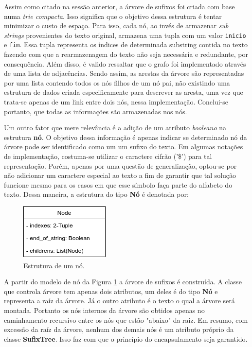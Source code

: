 Assim como citado na sessão anterior, a árvore de sufixos foi criada com base
numa \textit{trie compacta}.
Isso significa que o objetivo dessa estrutura é tentar minimizar o custo de
espaço.
Para isso, cada nó, ao invés de armazenar \textit{sub strings} provenientes
do texto original, armazena uma tupla com um valor \texttt{inicio} e
\texttt{fim}.
Essa tupla representa os índices de determinada substring contida no texto
fazendo com que a rearmazenagem do texto não seja necessária e redundante,
por consequência.
Além disso, é valido ressaltar que o grafo foi implementado através de uma lista
de adjacências.
Sendo assim, as arestas da árvore são representadas por uma lista contendo todos
os nós filhos de um nó pai, não existindo uma estrutura de dados criada
especificamente para descrever as aresta, uma vez que trata-se apenas de um
link entre dois nós, nessa implementação.
Conclui-se portanto, que todas as informações são armazenadas nos nós.

Um outro fator que mere relevância é a adição de um atributo \textit{booleano}
na estrutura \textbf{nó}.
O objetivo dessa informação é apenas indicar se determinado nó da árvore pode
ser identificado como um um sufixo do texto.
Em algumas notações de implementação, costuma-se utilizar o caractere cifrão
('\$') para tal representação.
Porém, apenas por uma questão de generalização, optou-se por não adicionar um
caractere especial ao texto a fim de garantir que tal solução funcione mesmo
para os casos em que esse símbolo faça parte do alfabeto do texto.
Dessa maneira, a estrutura do tipo \textbf{Nó} é denotada por:

\begin{figure}[h]
	\begin{center}
		\includegraphics[scale=0.75]{Figuras/node.png}
	\end{center}
	\caption{\label{fig:node} Estrutura de um nó.}
\end{figure}

A partir do modelo de nó da Figura \ref{fig:node} a árvore de sufixos é
construída.
A classe que controla árvore tem apenas dois atributos, um deles é do tipo
\textbf{Nó} e representa a raíz da árvore.
Já o outro atributo é o texto o qual a árvore será montada.
Portanto os nós internos da árvore são obtidos apenas no caminhamento recursivo
entre os nós que estão "abaixo" da raiz.
Em resumo, com excessão da raíz da árvore, nenhum dos demais nós é um atributo
próprio da classe \textbf{SufixTree}.
Isso faz com que o princípio do encapsulamento seja garantido.


